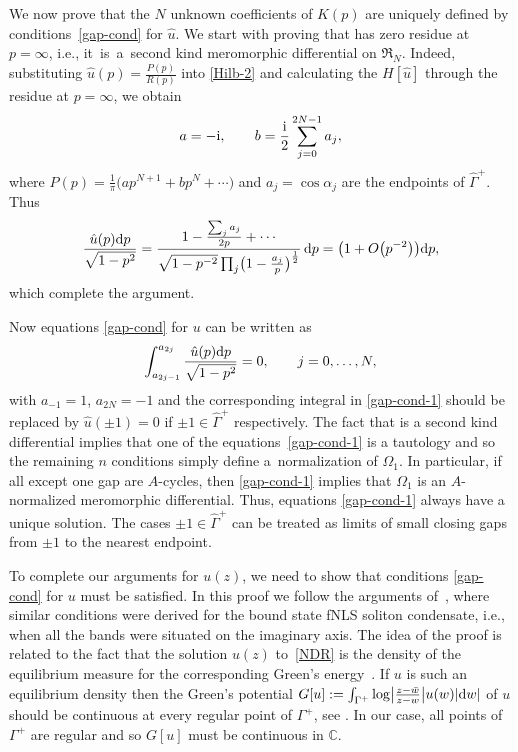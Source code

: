 \documentclass[pdftex]{sigma}
\numberwithin{equation}{section}
\newcommand{\G}{\Gamma}
\def\C{{\mathbb C}}
\def\a{\alpha}
\def\hf{\frac{1}{2}}
\def\G{\Gamma}
\begin{document}
We now prove that the $N$ unknown coefficients of $K(p)$ are uniquely defined by conditions~\eqref{gap-cond} for $\hat u$. We start with proving that  has zero residue at $p=\infty$, i.e., it~is~a~second kind meromorphic differential on $\mathfrak{R}_N$. Indeed, substituting $\hat u(p)=\frac{P(p)}{R(p)}$ into \eqref{Hilb-2} and calculating the $H[\hat u]$ through the residue at $p=\infty$, we obtain
\begin{gather}\label{coeff-u}
a=-{\rm i}, \qquad b=\frac {\rm i}2\sum_{j=0}^{2N-1}a_j,
\end{gather}
where $P(p)={\frac{1}{\pi}\bigl(ap^{N+1}+bp^N+\cdots\bigr)}$ and $a_j=\cos\a_j$ are the endpoints of $\hat\G^+$. Thus
\begin{gather*}
\frac{\hat u(p){\rm d}p}{\sqrt{1-p^2}} =\frac{1-\frac{\sum_ja_j}{2p}+\cdots}{\sqrt{1-p^{-2}}\prod_j\bigl(1-\frac{a_j}{p}\bigr)^\hf}\,{\rm d}p=\bigl(1+ O\bigl(p^{-2}\bigr)\bigr){\rm d}p,
\end{gather*}
which complete the argument.


Now equations \eqref{gap-cond} for $u$ can be written as
\begin{gather}\label{gap-cond-1}
\int_{a_{2j-1}}^{a_{2j}}\frac{\hat u(p){\rm d}p}{\sqrt{1-p^2}}=0, \qquad j=0,\dots,N,
\end{gather}
with $a_{-1}=1$, $a_{2N}=-1$ and the corresponding integral in \eqref{gap-cond-1} should be replaced by ${\hat u(\pm 1)=0}$ if
$\pm 1\in\hat\G^+$ respectively.
The fact that  is a second kind differential implies that one of the equations~\eqref{gap-cond-1} is a tautology and so the remaining $n$ conditions simply define a~normalization of $\Omega_1$. In particular, if all except one gap are $A$-cycles, then \eqref{gap-cond-1} implies that $\Omega_1$ is an $A$-normalized meromorphic differential. Thus, equations \eqref{gap-cond-1} always have a unique solution. The cases $\pm 1\in\hat\G^+$ can be treated as limits of small closing gaps from $\pm 1$ to the nearest endpoint.

To complete our arguments for $u(z)$, we need to show that conditions \eqref{gap-cond} for $u$ must be satisfied. In this proof we follow the arguments of~\cite[Theorem~6.1]{KT2021}, where similar conditions were derived for the bound state fNLS soliton condensate, i.e., when all the bands were situated on the imaginary axis. The idea of the proof is related to the fact that the solution $u(z)$ to~\eqref{NDR} is the density of the equilibrium measure for the corresponding Green's energy~\cite{KT2021}.
If $u$ is such an equilibrium density then the Green's potential
$G[u]:=\int_{\G^+}\log\bigl|\frac{z-\bar w }{z-w}\bigr|u(w)|{\rm d}w|$ of $u$ should be continuous at every regular point of $\G^+$, see \cite{ST}. In our case, all points of $\G^+$ are regular and so $G[u]$ must be continuous in $\C$.
\end{document}
